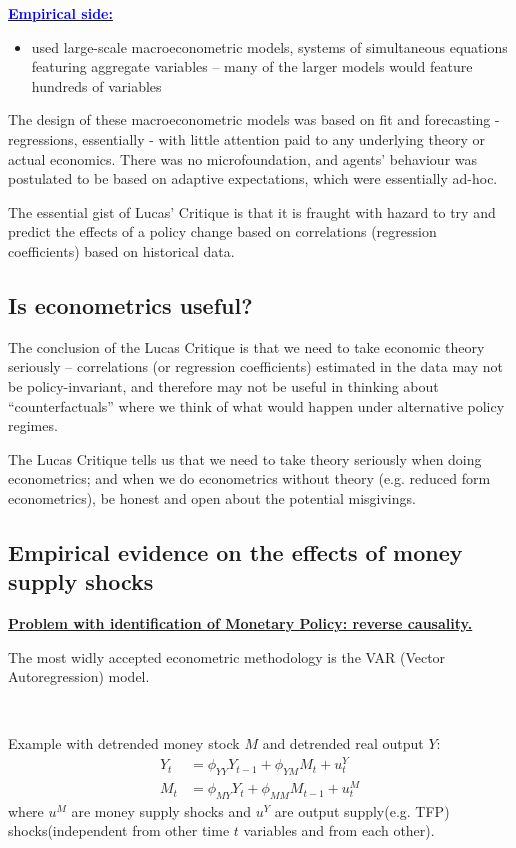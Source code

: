 \underline{\textcolor{blue}{\textbf{Empirical side:}}}
\begin{itemize}
    \item used large-scale macroeconometric models, systems of simultaneous equations featuring aggregate variables – many of the
    larger models would feature hundreds of variables
\end{itemize}

The design of these macroeconometric models was based on fit and forecasting - regressions, essentially - with little attention paid to any underlying
theory or actual economics. There was no microfoundation, and agents' behaviour was postulated to
be based on adaptive expectations, which were essentially ad-hoc.

The essential gist of Lucas' Critique is that it is fraught with hazard to try and predict the effects
of a policy change based on correlations (regression coefficients) based on historical data.

\subsection{Is econometrics useful?}

The conclusion of the Lucas Critique is that we need to take economic theory seriously – correlations
(or regression coefficients) estimated in the data may not be policy-invariant, and therefore may not
be useful in thinking about “counterfactuals” where we think of what would happen under alternative
policy regimes.

The Lucas Critique tells us that we need to take theory seriously when
doing econometrics; and when we do econometrics without theory (e.g. reduced form econometrics), be
honest and open about the potential misgivings.

\subsection{Empirical evidence on the effects of money supply shocks}

\underline{\textbf{Problem with identification of Monetary Policy: reverse causality.}}

The most widly accepted econometric methodology is the VAR (Vector Autoregression) model.

\begin{eg}
    \ 

    Example with detrended money stock $M$ and detrended real output $Y$:
    \begin{align*}
        Y_t &= \phi_{YY}Y_{t-1} + \phi _{YM}M_{t} + u_{t}^Y \\ 
        M_t &= \phi_{MY}Y_{t} + \phi _{MM}M_{t-1} + u_{t}^M
    \end{align*}
    where $u^M$ are money supply shocks and $u^Y$ are output supply(e.g. TFP) shocks(independent from other time $t$ variables and from each other).
\end{eg}

